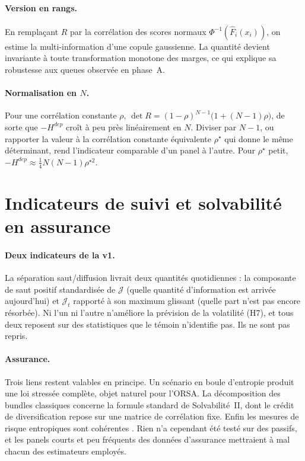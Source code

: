 \documentclass[11pt]{article}
\theoremstyle{definition}
\theoremstyle{remark}
\newcommand{\JJ}{\mathcal{J}}
\begin{document}
\paragraph{Version en rangs.} En remplaçant $R$ par la corrélation des scores
normaux $\Phi^{-1}(\hat F_i(x_i))$, on estime la multi-information d'une copule
gaussienne. La quantité devient invariante à toute transformation monotone des
marges, ce qui explique sa robustesse aux queues observée en phase~A.

\paragraph{Normalisation en $N$.} Pour une corrélation constante $\rho$,
$\det R=(1-\rho)^{N-1}\big(1+(N-1)\rho\big)$, de sorte que $-H^{dep}$ croît à peu
près linéairement en $N$. Diviser par $N-1$, ou rapporter la valeur à la
corrélation constante équivalente $\rho^\star$ qui donne le même déterminant,
rend l'indicateur comparable d'un panel à l'autre. Pour $\rho^\star$ petit,
$-H^{dep}\approx\tfrac14N(N-1)\rho^{\star2}$.

\section{Indicateurs de suivi et solvabilité en assurance}
\label{sec:monitoring}

\paragraph{Deux indicateurs de la v1.} La séparation saut/diffusion livrait deux
quantités quotidiennes : la composante de saut positif standardisée de $\JJ$
(quelle quantité d'information est arrivée aujourd'hui) et $\JJ_t$ rapporté à
son maximum glissant (quelle part n'est pas encore résorbée). Ni l'un ni l'autre
n'améliore la prévision de la volatilité (H7), et tous deux reposent sur des
statistiques que le témoin n'identifie pas. Ils ne sont pas repris.

\paragraph{Assurance.} Trois liens restent valables en principe. Un scénario en
boule d'entropie produit une loi stressée complète, objet naturel pour l'ORSA.
La décomposition des bundles classiques concerne la formule standard de
Solvabilité~II, dont le crédit de diversification repose sur une matrice de
corrélation fixe. Enfin les mesures de risque entropiques sont cohérentes
\citep{ahmadijavid2012,artzner1999}. Rien n'a cependant été testé sur des
passifs, et les panels courts et peu fréquents des données d'assurance mettraient
à mal chacun des estimateurs employés.
\end{document}

